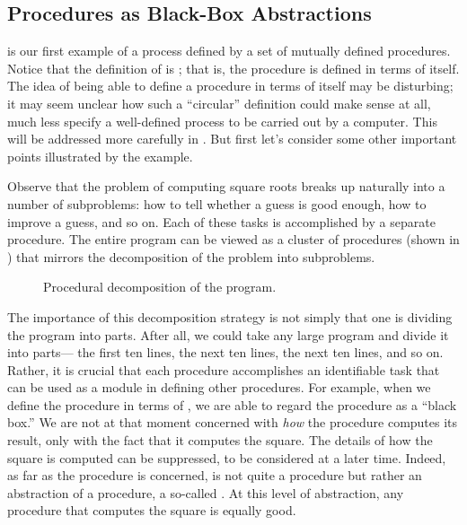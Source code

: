 \subsection{Procedures as Black-Box Abstractions}
\label{Section 1.1.8}

 is our first example of a process defined by a set of mutually defined procedures.
Notice that the definition of  is ;
that is, the procedure is defined in terms of itself.
The idea of being able to define a procedure in terms of itself may be disturbing;
it may seem unclear how such a “circular” definition could make sense at all, much less specify a well-defined process to be carried out by a computer.
This will be addressed more carefully in .
But first let’s consider some other important points illustrated by the  example.

Observe that the problem of computing square roots breaks up naturally into a number of subproblems:
how to tell whether a guess is good enough, how to improve a guess, and so on.
Each of these tasks is accomplished by a separate procedure.
The entire  program can be viewed as a cluster of procedures (shown in ) that mirrors the decomposition of the problem into subproblems.

\begin{figure}[tb]
	\centering
	
	\caption{
		Procedural decomposition of the  program.
	}
	\label{Figure 1.2}
\end{figure}

The importance of this decomposition strategy is not simply that one is dividing the program into parts.
After all, we could take any large program and divide it into parts---%
the first ten lines, the next ten lines, the next ten lines, and so on.
Rather, it is crucial that each procedure accomplishes an identifiable task that can be used as a module in defining other procedures.
For example, when we define the  procedure in terms of , we are able to regard the  procedure as a “black box.”
We are not at that moment concerned with \emph{how} the procedure computes its result, only with the fact that it computes the square.
The details of how the square is computed can be suppressed, to be considered at a later time.
Indeed, as far as the  procedure is concerned,  is not quite a procedure but rather an abstraction of a procedure, a so-called .
At this level of abstraction, any procedure that computes the square is equally good.


